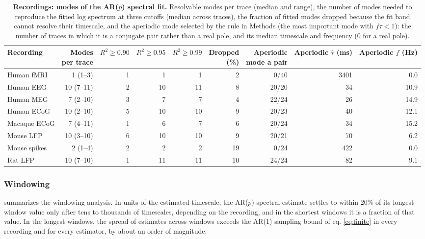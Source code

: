 \documentclass[pdflatex,sn-mathphys-num]{sn-jnl}
\begin{document}
\begin{table}[h]
\caption{\textbf{Recordings: modes of the AR($p$) spectral fit.} Resolvable modes per trace (median and range), the number of modes needed to reproduce the fitted log spectrum at three cutoffs (median across traces), the fraction of fitted modes dropped because the fit band cannot resolve their timescale, and the aperiodic mode selected by the rule in Methods (the most important mode with $f\tau < 1$): the number of traces in which it is a conjugate pair rather than a real pole, and its median timescale and frequency (0 for a real pole).}\label{tab:s_modes}
\setlength{\tabcolsep}{3pt}
\begin{tabular}{lrrrrrrrr}
\toprule
Recording & \shortstack[c]{Modes \\ per trace} & $R^2 \ge 0.90$ & $R^2 \ge 0.95$ & $R^2 \ge 0.99$ & \shortstack[c]{Dropped \\ (\%)} & \shortstack[c]{Aperiodic \\ mode a pair} & \shortstack[c]{Aperiodic \\ $\hat\tau$ (ms)} & \shortstack[c]{Aperiodic \\ $f$ (Hz)} \\
\midrule
Human fMRI & 1 (1--3) & 1 & 1 & 1 & 2 & 0/40 & 3401 & 0.0 \\
Human EEG & 10 (7--11) & 2 & 10 & 11 & 8 & 20/20 & 34 & 10.9 \\
Human MEG & 7 (2--10) & 3 & 7 & 7 & 4 & 22/24 & 26 & 14.9 \\
Human ECoG & 10 (2--10) & 5 & 10 & 10 & 9 & 20/23 & 40 & 12.1 \\
Macaque ECoG & 7 (4--11) & 1 & 6 & 7 & 6 & 20/24 & 34 & 15.2 \\
Mouse LFP & 10 (3--10) & 6 & 10 & 10 & 9 & 20/21 & 70 & 6.2 \\
Mouse spikes & 2 (1--4) & 2 & 2 & 2 & 19 & 0/24 & 422 & 0.0 \\
Rat LFP & 10 (7--10) & 1 & 11 & 11 & 10 & 24/24 & 82 & 9.1 \\
\bottomrule
\end{tabular}
\end{table}

\subsubsection*{Windowing}

 summarizes the windowing analysis. In units of the estimated timescale, the AR($p$) spectral estimate settles to within 20\% of its longest-window value only after tens to thousands of timescales, depending on the recording, and in the shortest windows it is a fraction of that value. In the longest windows, the spread of estimates across windows exceeds the AR(1) sampling bound of eq. \ref{eq:finite} in every recording and for every estimator, by about an order of magnitude.
\end{document}
